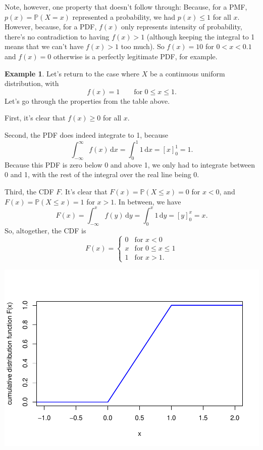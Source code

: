 \documentclass[
  a4paper,
]{book}
\theoremstyle{definition}
\theoremstyle{definition}
\newtheorem{example}{Example}[chapter]
\theoremstyle{definition}
\theoremstyle{definition}
\theoremstyle{remark}
\begin{document}
Note, however, one property that doesn't follow through: Because, for a PMF, \(p(x) = \mathbb P(X = x)\) represented a probability, we had \(p(x) \leq 1\) for all \(x\). However, because, for a PDF, \(f(x)\) only represents intensity of probability, there's no contradiction to having \(f(x) > 1\) (although keeping the integral to 1 means that we can't have \(f(x) > 1\) too much). So \(f(x) = 10\) for \(0 <x < 0.1\) and \(f(x) = 0\) otherwise is a perfectly legitimate PDF, for example.

\begin{example}
Let's return to the case where \(X\) be a continuous uniform distribution, with
\[  f(x) = 1 \qquad \text{for $0 \leq x \leq 1$} . \]
Let's go through the properties from the table above.

First, it's clear that \(f(x) \geq 0\) for all \(x\).

Second, the PDF does indeed integrate to 1, because
\[ \int_{-\infty}^\infty f(x) \, \mathrm dx = \int_0^1 1 \, \mathrm dx = [x]_0^1 = 1 .    \]
Because this PDF is zero below 0 and above 1, we only had to integrate between 0 and 1, with the rest of the integral over the real line being 0.

Third, the CDF \(F\). It's clear that \(F(x) = \mathbb P(X \leq x) = 0\) for \(x < 0\), and \(F(x) = \mathbb P(X \leq x) = 1\) for \(x > 1\). In between, we have
\[ F(x) = \int_{-\infty}^x f(y) \,\mathrm dy = \int_0^x 1\, \mathrm dy = [y]_0^x = x .   \]
So, altogether, the CDF is
\[  F(x) = \begin{cases} 0 & \text{for } x < 0 \\ x & \text{for }0 \leq x \leq 1 \\ 1 & \text{for }x > 1 . \end{cases} \]

\includegraphics{math1710_files/figure-latex/contunif-cdf-1.pdf}


\end{example}
\end{document}
